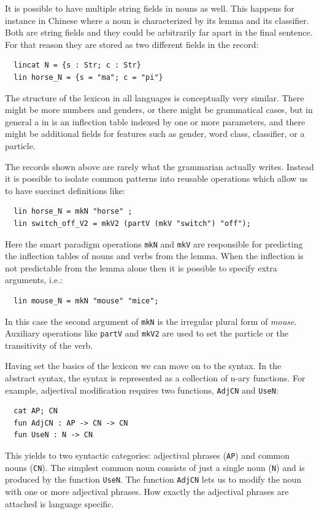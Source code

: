 \documentclass[output=paper]{langsci/langscibook}
\begin{document}
It is possible to have multiple string fields in nouns as well. This happens for instance in Chinese where a noun is characterized by its lemma and its classifier. Both are string fields and they could be arbitrarily far apart in the final sentence. For that reason they are stored as two different fields in the record:
\begin{verbatim}
  lincat N = {s : Str; c : Str}
  lin horse_N = {s = "ma"; c = "pi"}
\end{verbatim}

The structure of the lexicon in all languages is 
conceptually very similar. There might be more numbers and genders, 
or there might be grammatical cases, but in general a  in 
 is an inflection table indexed by one or more parameters, and 
there might be additional fields for features such as gender, 
word class, classifier, or a particle. 

The records shown above are rarely what 
the  grammarian actually writes. Instead it is possible to 
isolate common patterns into reusable operations which allow us to 
have succinct definitions like:
\begin{verbatim}
  lin horse_N = mkN "horse" ;
  lin switch_off_V2 = mkV2 (partV (mkV "switch") "off");
\end{verbatim}
Here the smart paradigm \citep{dblp:conf/eacl/detrezr12} operations 
\verb=mkN= and \verb=mkV= are responsible for predicting 
the inflection tables of nouns and verbs from the lemma. 
When the inflection is not predictable from the lemma alone then 
it is possible to specify extra arguments, i.e.:
\begin{verbatim}
  lin mouse_N = mkN "mouse" "mice";
\end{verbatim}
In this case the second argument of \verb=mkN= is 
the irregular plural form of \textit{mouse}. Auxiliary operations 
like \verb=partV= and \verb=mkV2= are used to set the particle or 
the transitivity of the verb.

Having set the basics of the lexicon we can move on to the syntax. 
In the abstract syntax, the syntax is represented as a collection of 
n-ary functions. For example, adjectival modification requires two 
functions, \verb=AdjCN= and \verb=UseN=:
\begin{verbatim}
  cat AP; CN
  fun AdjCN : AP -> CN -> CN
  fun UseN : N -> CN
\end{verbatim}
This yields to two syntactic categories: adjectival phrases (\verb=AP=) and 
common nouns (\verb=CN=). The simplest common noun consists of just 
a single noun (\verb=N=) and is produced by the function \verb=UseN=. 
The function \verb=AdjCN= lets us to modify the noun with one or 
more adjectival phrases. How exactly the adjectival phrases are
attached is language specific.
\end{document}
